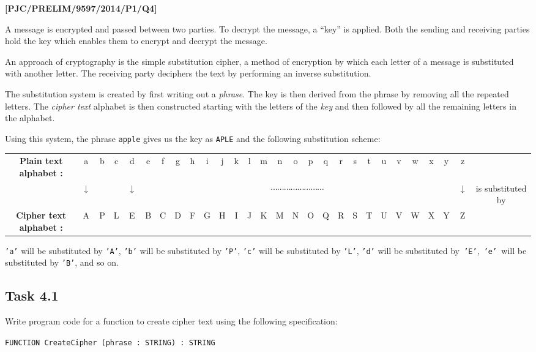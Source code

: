 \item \textbf{{[}PJC/PRELIM/9597/2014/P1/Q4{]} }

A message is encrypted and passed between two parties. To decrypt
the message, a \textquotedblleft key\textquotedblright{} is applied.
Both the sending and receiving parties hold the key which enables
them to encrypt and decrypt the message. 

An approach of cryptography is the simple substitution cipher, a method
of encryption by which each letter of a message is substituted with
another letter. The receiving party deciphers the text by performing
an inverse substitution. 

The substitution system is created by first writing out a \emph{phrase}.
The key is then derived from the phrase by removing all the repeated
letters. The \emph{cipher text} alphabet is then constructed starting
with the letters of the \emph{key} and then followed by all the remaining
letters in the alphabet. 

Using this system, the phrase \textquotedbl\texttt{apple}\textquotedbl{}
gives us the key as \textquotedbl\texttt{APLE}\textquotedbl{} and
the following substitution scheme: 

\begin{tabular}{cccccccccccccccccccccccccccc}
\textbf{Plain text alphabet :} & a & b & c & d & e & f & g & h & i & j & k & l & m & n & o & p & q & r & s & t & u & v & w & x & y & z & \tabularnewline
 & $\downarrow$ &  &  & $\downarrow$ & \multicolumn{21}{c}{$\cdots$$\cdots$$\cdots$$\cdots$$\cdots$$\cdots$$\cdots$$\cdots$} & $\downarrow$ & is substituted by\tabularnewline
\textbf{Cipher text alphabet :} & A & P & L & E & B & C & D & F & G & H & I & J & K & M & N & O & Q & R & S & T & U & V & W & X & Y & Z & \tabularnewline
\end{tabular}

\texttt{'a'} will be substituted by \texttt{'A'}, \texttt{'b'} will
be substituted by \texttt{'P'}, \texttt{'c'} will be substituted by
\texttt{'L'}, \texttt{'d'} will be substituted by\texttt{ 'E'},\texttt{
'e' }will be substituted by \texttt{'B'}, and so on. 

\subsection*{Task 4.1 }

Write program code for a function to create cipher text using the
following specification:
\noindent \begin{center}
\texttt{FUNCTION CreateCipher (phrase : STRING) : STRING }
\par\end{center}

